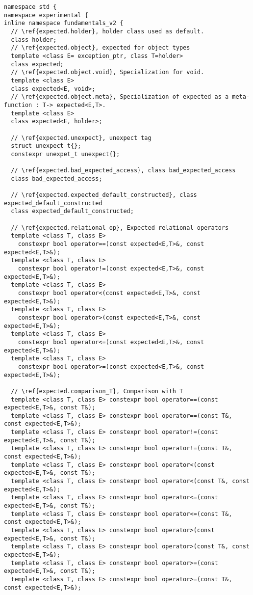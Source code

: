 \documentclass[a4paper,10pt]{article}
\begin{document}
\begin{lstlisting}
namespace std {
namespace experimental {
inline namespace fundamentals_v2 {
  // \ref{expected.holder}, holder class used as default.  
  class holder;
  // \ref{expected.object}, expected for object types  
  template <class E= exception_ptr, class T=holder>
  class expected;
  // \ref{expected.object.void}, Specialization for void.  
  template <class E>
  class expected<E, void>;
  // \ref{expected.object.meta}, Specialization of expected as a meta-function : T-> expected<E,T>.  
  template <class E>
  class expected<E, holder>;
   
  // \ref{expected.unexpect}, unexpect tag
  struct unexpect_t{};
  constexpr unexpet_t unexpect{};
   
  // \ref{expected.bad_expected_access}, class bad_expected_access
  class bad_expected_access;
  
  // \ref{expected.expected_default_constructed}, class expected_default_constructed
  class expected_default_constructed;
  
  // \ref{expected.relational_op}, Expected relational operators
  template <class T, class E>
    constexpr bool operator==(const expected<E,T>&, const expected<E,T>&);
  template <class T, class E>
    constexpr bool operator!=(const expected<E,T>&, const expected<E,T>&);
  template <class T, class E>
    constexpr bool operator<(const expected<E,T>&, const expected<E,T>&);
  template <class T, class E>
    constexpr bool operator>(const expected<E,T>&, const expected<E,T>&);
  template <class T, class E>
    constexpr bool operator<=(const expected<E,T>&, const expected<E,T>&);
  template <class T, class E>
    constexpr bool operator>=(const expected<E,T>&, const expected<E,T>&);
    
  // \ref{expected.comparison_T}, Comparison with T
  template <class T, class E> constexpr bool operator==(const expected<E,T>&, const T&);
  template <class T, class E> constexpr bool operator==(const T&, const expected<E,T>&);
  template <class T, class E> constexpr bool operator!=(const expected<E,T>&, const T&);
  template <class T, class E> constexpr bool operator!=(const T&, const expected<E,T>&);
  template <class T, class E> constexpr bool operator<(const expected<E,T>&, const T&);
  template <class T, class E> constexpr bool operator<(const T&, const expected<E,T>&);
  template <class T, class E> constexpr bool operator<=(const expected<E,T>&, const T&);
  template <class T, class E> constexpr bool operator<=(const T&, const expected<E,T>&);
  template <class T, class E> constexpr bool operator>(const expected<E,T>&, const T&);
  template <class T, class E> constexpr bool operator>(const T&, const expected<E,T>&);
  template <class T, class E> constexpr bool operator>=(const expected<E,T>&, const T&);
  template <class T, class E> constexpr bool operator>=(const T&, const expected<E,T>&);


\end{lstlisting}
\end{document}
